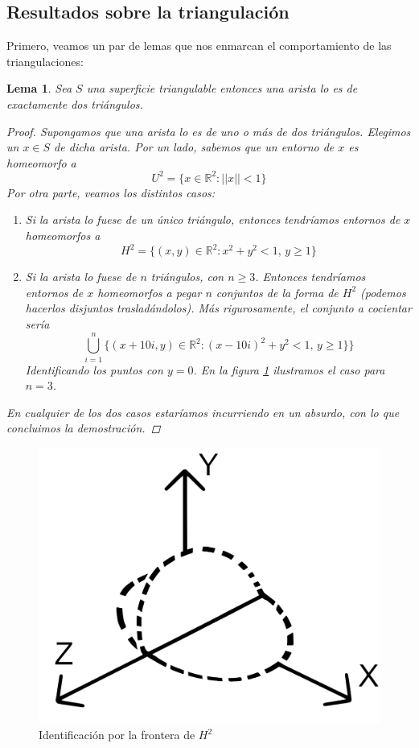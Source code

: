 \documentclass[a4paper,11pt,spanish, twoside, leqno]{tfg-uam}
\newcommand*{\reales}{\mathbb{R}}
\newtheorem{lema}[teor]{Lema}
\theoremstyle{definition}
\begin{document}
\subsection*{Resultados sobre la triangulación}

Primero, veamos un par de lemas que nos enmarcan el comportamiento de las triangulaciones:

\begin{lema}\label{lema:lema1detriangulacion}
	Sea $S$ una superficie triangulable entonces una arista lo es de exactamente dos triángulos.
	\begin{proof}
	    Supongamos que una arista lo es de uno o más de dos triángulos. Elegimos un $x\in S$ de dicha arista. Por un lado, sabemos que un entorno de $x$ es homeomorfo a 
	    \[U^2 = \{x\in\reales^2: ||x||<1\}\]
	    Por otra parte, veamos los distintos casos:
	    \begin{enumerate}
	        \item[(a)] Si la arista lo fuese de un único triángulo, entonces tendríamos entornos de $x$ homeomorfos a
	        \[ H^2 = \{(x,y)\in\reales^2: x^2+y^2<1, \, y\geq 1 \} \]
	        \item[(b)] Si la arista lo fuese de  $n$ triángulos, con $n\geq 3$. Entonces tendríamos entornos de $x$ homeomorfos a pegar $n$ conjuntos de la forma de $H^2$ (podemos hacerlos disjuntos trasladándolos). Más rigurosamente, el conjunto a cocientar sería
	        \[
            \bigcup^n_{i=1} \{(x+10i,y)\in\reales^2: (x-10i)^2+y^2<1, \, y\geq 1 \} \}	        
	        \]
	        Identificando los puntos con $y=0$. En la figura \ref{fig:tripleplano} ilustramos el caso para $n=3$.
	    \end{enumerate}    
	    En cualquier de los dos casos estaríamos incurriendo en un absurdo, con lo que concluimos la demostración.
	\end{proof}
\end{lema}
\begin{figure}[h!]
			\centering
			\includegraphics[width=0.4\linewidth]{imagenes/tripleplano.png}
			\caption{Identificación por la frontera de $H^2$}
			\label{fig:tripleplano}
		\end{figure}
\end{document}
